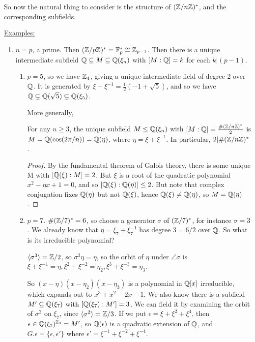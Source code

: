 \documentclass[10pt,a4paper]{article}
\begin{document}
So now the natural thing to consider is the structure of $(\mathbb{Z}/n\mathbb{Z})^{\ast}$, and the corresponding subfields.

\underline{Examples:}
\begin{enumerate}
\item $n=p$, a prime. Then $(\mathbb{Z}/p\mathbb{Z})^{\ast} = \mathbb{F}_p^{\ast} \cong \mathbb{Z}_{p-1}$. Then there is a unique intermediate subfield $\mathbb{Q} \subseteq M \subseteq \mathbb{Q}(\xi_n)$ with $[M:\mathbb{Q}] = k$ for each $k|(p-1)$.
\begin{enumerate}
\item $p=5$, so we have $\mathbb{Z}_4$, giving a unique intermediate field of degree 2 over $\mathbb{Q}$. It is generated by $\xi+\xi^{-1} = \frac{1}{2}(-1+\sqrt{5})$, and so we have $\mathbb{Q} \subsetneq \mathbb{Q}(\sqrt{5})\subsetneq \mathbb{Q}(\xi_5)$.

More generally,
\begin{lemma}
For any $n \geq 3$, the unique subfield $M \leq \mathbb{Q}(\xi_n)$ with $[M:\mathbb{Q}] = \frac{\#(\mathbb{Z}/n\mathbb{Z})^{\ast}}{2}$ is $M = \mathbb{Q}(\cos(2\pi/n)) = \mathbb{Q}(\eta)$, where $\eta  = \xi+\xi^{-1}$. In particular, $2 | \#(\mathbb{Z}/n\mathbb{Z})^{\ast}$.
\end{lemma}
\begin{proof}
By the fundamental theorem of Galois theory, there is some unique M with $[\mathbb{Q}(\xi):M] = 2$. But $\xi$ is a root of the quadratic polynomial $x^2-\eta x+1 = 0$, and so $[\mathbb{Q}(\xi):\mathbb{Q}(\eta)] \leq 2$. But note that complex conjugation fixes $\mathbb{Q}(\eta)$ but not $\mathbb{Q}(\xi)$, hence $\mathbb{Q}(\xi)\neq \mathbb{Q}(\eta)$, so $M = \mathbb{Q}(\eta)$.
\end{proof}
\item $p=7$. $\#(\mathbb{Z}/7)^{\ast} = 6$, so choose a generator $\sigma$ of $(\mathbb{Z}/7)^{\ast}$, for instance $\sigma = 3$. We already know that $\eta = \xi_7+\xi_7^{-1}$ has degree $3=6/2$ over $\mathbb{Q}$. So what is its irreducible polynomial?

$\langle \sigma^3 \rangle = \mathbb{Z}/2$, so $\sigma^3\eta = \eta$, so the orbit of $\eta$ under $\angle{\sigma}$ is $\xi+\xi^{-1} = \eta, \xi^2 + \xi^{-2} = \eta_2, \xi^3+\xi^{-3} = \eta_3$.

So $(x-\eta)(x-\eta_2)(x-\eta_3)$ is a polynomial in $\mathbb{Q}[x]$ irreducible, which expands out to $x^3+x^2-2x-1$. We also know there is a subfield $M'\subseteq \mathbb{Q}(\xi_7)$ with $[\mathbb{Q}(\xi_7):M'] = 3$. We can field it by examining the orbit of $\sigma^2$ on $\xi_7$, since $\langle \sigma^2 \rangle = \mathbb{Z}/3$. If we put $\epsilon = \xi + \xi^2 + \xi^4$, then $\epsilon \in \mathbb{Q}(\xi_7)^{\mathbb{Z}_3} = M'$, so $\mathbb{Q}(\epsilon)$ is a quadratic extension of $\mathbb{Q}$, and $G.\epsilon = \{\epsilon, \epsilon'\}$ where $\epsilon' = \xi^{-1} + \xi^{-2} + \xi^{-4}$.


\end{enumerate}
\end{enumerate}
\end{document}
